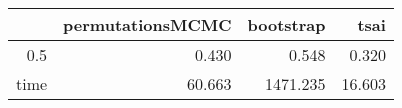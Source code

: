 \begin{table}[ht]
\centering
\begingroup\tiny
\begin{tabular}{rrrr}
  \hline
 & permutationsMCMC & bootstrap & tsai \\ 
  \hline
0.5 & 0.430 & 0.548 & 0.320 \\ 
  time & 60.663 & 1471.235 & 16.603 \\ 
   \hline
\end{tabular}
\endgroup
\end{table}
